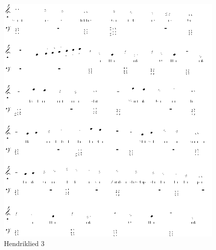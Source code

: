 \begin{figure}[!htbp]
  \includegraphics[width=\textwidth,height=\textheight,keepaspectratio]{../songs/13_hendriklied_3_2.png}
  \caption{Hendriklied 3}
  \label{fig:13_hendriklied_3}
\end{figure}
